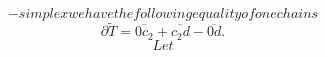 $$-simplex we have the following equality of one chains
$$$$
\partial \widetilde{T} = \overline{0c_2} + \overline{c_2d} - \overline{0d}.
$$$$
Let $$